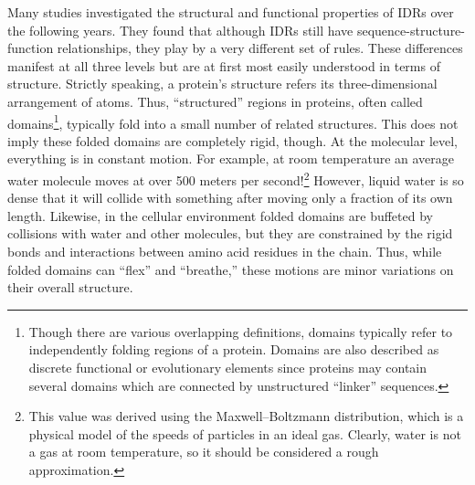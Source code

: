Many studies investigated the structural and functional properties of IDRs over the following years. They found that although IDRs still have sequence-structure-function relationships, they play by a very different set of rules. These differences manifest at all three levels but are at first most easily understood in terms of structure. Strictly speaking, a protein's structure refers its three-dimensional arrangement of atoms. Thus, ``structured'' regions in proteins, often called domains\footnote{Though there are various overlapping definitions, domains typically refer to independently folding regions of a protein. Domains are also described as discrete functional or evolutionary elements since proteins may contain several domains which are connected by unstructured ``linker'' sequences.}, typically fold into a small number of related structures. This does not imply these folded domains are completely rigid, though. At the molecular level, everything is in constant motion. For example, at room temperature an average water molecule moves at over 500 meters per second!\footnote{This value was derived using the Maxwell–Boltzmann distribution, which is a physical model of the speeds of particles in an ideal gas. Clearly, water is not a gas at room temperature, so it should be considered a rough approximation.} However, liquid water is so dense that it will collide with something after moving only a fraction of its own length. Likewise, in the cellular environment folded domains are buffeted by collisions with water and other molecules, but they are constrained by the rigid bonds and interactions between amino acid residues in the chain. Thus, while folded domains can ``flex'' and ``breathe,'' these motions are minor variations on their overall structure.

